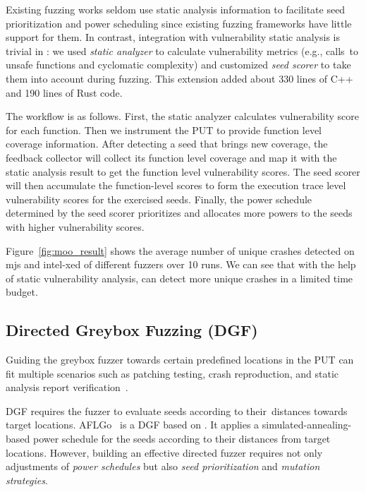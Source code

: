 Existing fuzzing works seldom use static analysis information to facilitate seed prioritization and power scheduling since existing fuzzing frameworks have little support for them.
In contrast, integration with vulnerability static analysis is trivial in \FOT: we used \emph{static analyzer} to calculate vulnerability metrics (e.g., calls~to unsafe functions and cyclomatic complexity) and customized \emph{seed scorer} to take them into account during fuzzing. This extension added about 330 lines of C++ and 190 lines of Rust code.

The workflow is as follows.
First, the static analyzer calculates vulnerability score for each function. Then we instrument the PUT to provide function level coverage information.
After detecting a seed that brings new coverage, the feedback collector will collect its function level coverage and map it with the static analysis result to get the function level vulnerability scores.
The seed scorer will then accumulate the function-level scores to form the execution trace level vulnerability scores for the exercised seeds.
Finally, the power schedule determined by the seed scorer prioritizes and allocates more powers to the seeds with higher vulnerability scores.



Figure~\ref{fig:moo_result} shows the average number of unique crashes detected on mjs and intel-xed of different fuzzers over 10 runs.
We can see that with the help of static vulnerability analysis, {\FOT} can detect more unique crashes in a limited time budget.
 

\subsection{Directed Greybox Fuzzing (DGF)}\label{subsec:dgf}

Guiding the greybox fuzzer towards certain predefined locations in the PUT can fit multiple scenarios such as patching testing, crash reproduction, and static analysis report verification~\cite{Bohme:2017:DGF}.






DGF requires the fuzzer to evaluate seeds according to their~distances towards target locations.
AFLGo~\cite{Bohme:2017:DGF} is a DGF based on {\AFL}. It applies a simulated-annealing-based power schedule for the seeds according to their distances from target locations.
However, building an effective directed fuzzer requires not only adjustments of \emph{power schedules} but also \emph{seed prioritization} and \emph{mutation strategies}.



